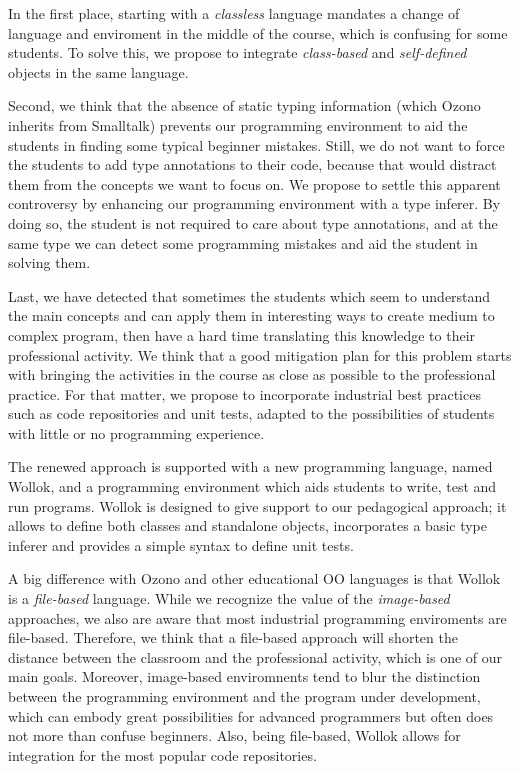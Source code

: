In the first place, starting with a \emph{classless} language mandates a change of language and enviroment in the middle of the course,
which is confusing for some students. 
To solve this, we propose to integrate \emph{class-based} and \emph{self-defined} objects in the same language.

Second, we think that the absence of static typing information (which Ozono inherits from Smalltalk) prevents our programming environment to aid the students in finding some typical beginner mistakes.
Still, we do not want to force the students to add type annotations to their code, because that would distract them from the concepts we want to focus on.
We propose to settle this apparent controversy by enhancing our programming environment with a type inferer.
By doing so, the student is not required to care about type annotations, and at the same type we can detect some programming mistakes and aid the student in solving them.

Last, we have detected that sometimes the students which seem to understand the main concepts and can apply them in interesting ways to create medium to complex program, 
then have a hard time translating this knowledge to their professional activity.
We think that a good mitigation plan for this problem starts with bringing the activities in the course as close as possible to the professional practice.
For that matter, we propose to incorporate industrial best practices such as code repositories and unit tests, adapted to the possibilities of students with little or no programming experience.

\medskip
The renewed approach is supported with a new programming language, named Wollok, and a programming environment which aids students to write, test and run programs.
Wollok is designed to give support to our pedagogical approach; 
it allows to define both classes and standalone objects,
incorporates a basic type inferer
and provides a simple syntax to define unit tests.

A big difference with Ozono and other educational OO languages is that Wollok is a \emph{file-based} language.
While we recognize the value of the \emph{image-based} approaches, we also are aware that most industrial programming enviroments are file-based.
Therefore, we think that a file-based approach will shorten the distance between the classroom and the professional activity, which is one of our main goals.
Moreover, image-based enviromnents tend to blur the distinction between the programming environment and the program under development,
which can embody great possibilities for advanced programmers but often does not more than confuse beginners.
Also, being file-based, Wollok allows for integration for the most popular code
repositories. 

